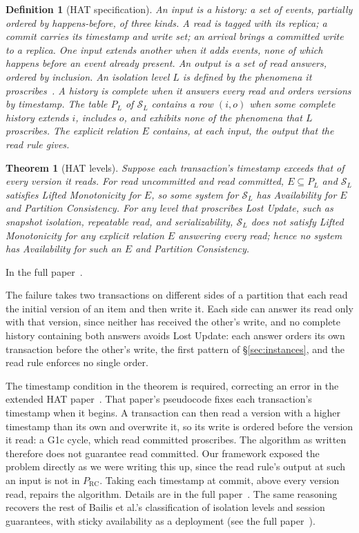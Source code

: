 \documentclass[sigconf]{cidr-2027}
\makeatletter
\newtheorem{theorem}{Theorem}
\newtheorem{definition}{Definition}
\theoremstyle{remark}
\newcommand{\inrel}{extends\xspace}          %
\newcommand{\Spec}{\mathcal{S}}
\newcommand{\extended}{the full paper~\cite{hellerstein2026completecalmfull}}
\newcommand{\proofinfull}{\par\pushQED{\qed}\normalfont\topsep2\p@\relax
  \trivlist\item[\@proofindent\hskip\labelsep{\@proofnamefont\proofname\@addpunct{.}}]%
  \ignorespaces In the full paper~\cite{hellerstein2026completecalmfull}.%
  \popQED\endtrivlist\@endpefalse}
\makeatother
\begin{document}
\begin{definition}[HAT specification]
\label{def:hat-spec}
An input is a history: a set of events, partially ordered by happens-before,
of three kinds.  A read is tagged with its replica; a commit carries its
timestamp and write set; an arrival brings a committed write to a replica.  One
input \inrel another when it adds events, none of which happens before an event
already present.  An output is a set of read answers, ordered by inclusion.  An
isolation level $L$ is defined by the phenomena it
proscribes~\cite{adya1999weakconsistency}.  A history is \emph{complete} when it answers every read and orders versions by
timestamp.  The table $P_L$ of $\Spec_L$ contains a row $(i,o)$ when some
complete history extends $i$, includes $o$, and exhibits none of the phenomena
that $L$ proscribes.  The explicit relation $E$
contains, at each input, the output that the read rule gives.
\end{definition}

\begin{theorem}[HAT levels]
\label{thm:hat-levels}
Suppose each transaction's timestamp exceeds that of every version it reads.
For read uncommitted and read committed, $E\subseteq P_L$ and $\Spec_L$
satisfies Lifted Monotonicity for $E$, so some system for $\Spec_L$ has
Availability for $E$ and Partition Consistency.  For any level that proscribes
Lost Update, such as snapshot isolation, repeatable read, and serializability, $\Spec_L$ does not satisfy Lifted Monotonicity for any explicit relation $E$ answering every read; hence no system has Availability for such an $E$ and Partition Consistency.
\end{theorem}
\proofinfull

The failure takes two transactions on different sides of a partition that
each read the initial version of an item and then write it.  Each side can
answer its read only with that version, since neither has received the
other's write, and no complete history containing both answers avoids Lost
Update: each answer orders its own transaction before the other's write, the
first pattern of \S\ref{sec:instances}, and the read rule enforces no single
order.

The timestamp condition in the theorem is required, correcting an error in
the extended HAT paper~\cite{bailis2013hatextended}.  That paper's pseudocode
fixes each transaction's timestamp when it begins.  A transaction can then read
a version with a higher timestamp than its own and overwrite it, so its write
is ordered before the version it read: a G1c cycle, which read committed
proscribes.  The algorithm as written therefore does not guarantee read
committed.  Our framework exposed the problem directly as we were writing this
up, since the read rule's output at such an input is not in $P_{\mathrm{RC}}$.
Taking each timestamp at commit, above every version read, repairs the
algorithm.  Details are in \extended.  The same reasoning recovers the rest of
Bailis et al.'s classification of isolation levels and session guarantees, with
sticky availability as a deployment (see \extended).
\end{document}
